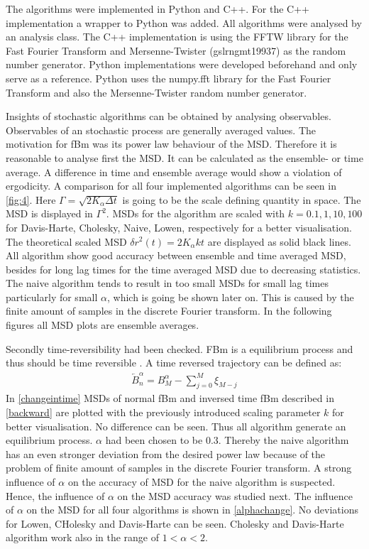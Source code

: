 \documentclass[
  a4paper,BCOR10mm,oneside,
  headsepline,footsepline,%
  fleqn,openbib
]{scrbook}
\begin{document}
The algorithms were implemented in Python and C++. For the C++ implementation a wrapper to Python was added. All algorithms were analysed by an analysis class. The C++ implementation is using the FFTW library for the Fast Fourier Transform \cite{FFTW} and Mersenne-Twister (gsl\texttt{\textunderscore}rng\texttt{\textunderscore}mt19937) \cite{Matsumoto1998} as the random number generator. Python implementations were developed beforehand and only serve as a reference. Python uses the numpy.fft library for the Fast Fourier Transform and also the Mersenne-Twister random number generator.\par
Insights of stochastic algorithms can be obtained by analysing observables. Observables of an stochastic process are generally averaged values. The motivation for fBm was its power law behaviour of the MSD. Therefore it is reasonable to analyse first the MSD. It can be calculated as the ensemble- or time average. A difference in time and ensemble average would show a violation of ergodicity. A comparison for all four implemented algorithms can be seen in \cref{fig:4}. Here $\Gamma=\sqrt{2K_\alpha \Delta t}$ is going to be the scale defining quantity in space. The MSD is displayed in $\Gamma^2$. MSDs for the algorithm are scaled with $k=0.1,1,10,100$ for Davis-Harte, Cholesky, Naive, Lowen, respectively for a better visualisation. The theoretical scaled MSD $\delta r^2 (t)=2 K_\alpha k t$ are displayed as solid black lines. All algorithm show good accuracy between ensemble and time averaged MSD, besides for long lag times for the time averaged MSD due to decreasing statistics. The naive algorithm tends to result in too small MSDs for small lag times particularly for small $\alpha$, which is going be shown later on. This is caused by the finite amount of samples in the discrete Fourier transform. In the following figures all MSD plots are ensemble averages.\par Secondly time-reversibility had been checked. FBm is a equilibrium process and thus should be time reversible  \cite{Horvai2007}. A time reversed trajectory can be defined as:
\begin{align} \label{backward}
 \overleftarrow{B}^{\alpha}_n=B^{\alpha}_M-\sum^M_{j=0} \xi_{M-j}
\end{align}
In \cref{changeintime}  MSDs of normal fBm and inversed time fBm described in \cref{backward} are plotted with the previously introduced scaling parameter $k$ for better visualisation. No difference can be seen. Thus all algorithm generate an equilibrium process. $\alpha$ had been chosen to be $0.3$. Thereby the naive algorithm has an even stronger deviation from the desired power law because of the problem of finite amount of samples in the discrete Fourier transform. A strong influence of $\alpha$ on the accuracy of MSD for the naive algorithm is suspected. Hence, the influence of $\alpha$ on the MSD accuracy was studied next. The influence of $\alpha$ on the MSD for all four algorithms is shown in \cref{alphachange}. No deviations for Lowen, CHolesky and Davis-Harte can be seen. Cholesky and Davis-Harte algorithm work also in the range of $1<\alpha<2$. 
\end{document}
